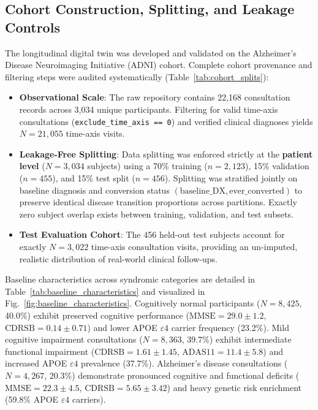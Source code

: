 \documentclass[11pt,a4paper]{article}
\begin{document}
\subsection{Cohort Construction, Splitting, and Leakage Controls}
\label{sec:method_data}
The longitudinal digital twin was developed and validated on the Alzheimer's Disease Neuroimaging Initiative (ADNI) cohort. Complete cohort provenance and filtering steps were audited systematically (Table~\ref{tab:cohort_splits}):
\begin{itemize}
    \item \textbf{Observational Scale}: The raw repository contains 22,168 consultation records across 3,034 unique participants. Filtering for valid time-axis consultations (\texttt{exclude\_time\_axis == 0}) and verified clinical diagnoses yields $N = 21,055$ time-axis visits.
    \item \textbf{Leakage-Free Splitting}: Data splitting was enforced strictly at the \textbf{patient level} ($N = 3,034$ subjects) using a 70\% training ($n = 2,123$), 15\% validation ($n = 455$), and 15\% test split ($n = 456$). Splitting was stratified jointly on baseline diagnosis and conversion status $\left(\text{baseline\_DX}, \text{ever\_converted}\right)$ to preserve identical disease transition proportions across partitions. Exactly zero subject overlap exists between training, validation, and test subsets.
    \item \textbf{Test Evaluation Cohort}: The 456 held-out test subjects account for exactly $N = 3,022$ time-axis consultation visits, providing an un-imputed, realistic distribution of real-world clinical follow-ups.
\end{itemize}




Baseline characteristics across syndromic categories are detailed in Table~\ref{tab:baseline_characteristics} and visualized in Fig.~\ref{fig:baseline_characteristics}. Cognitively normal participants ($N = 8,425$, 40.0\%) exhibit preserved cognitive performance ($\text{MMSE} = 29.0 \pm 1.2$, $\text{CDRSB} = 0.14 \pm 0.71$) and lower APOE $\varepsilon4$ carrier frequency (23.2\%). Mild cognitive impairment consultations ($N = 8,363$, 39.7\%) exhibit intermediate functional impairment ($\text{CDRSB} = 1.61 \pm 1.45$, $\text{ADAS11} = 11.4 \pm 5.8$) and increased APOE $\varepsilon4$ prevalence (37.7\%). Alzheimer's disease consultations ($N = 4,267$, 20.3\%) demonstrate pronounced cognitive and functional deficits ($\text{MMSE} = 22.3 \pm 4.5$, $\text{CDRSB} = 5.65 \pm 3.42$) and heavy genetic risk enrichment (59.8\% APOE $\varepsilon4$ carriers).
\end{document}
